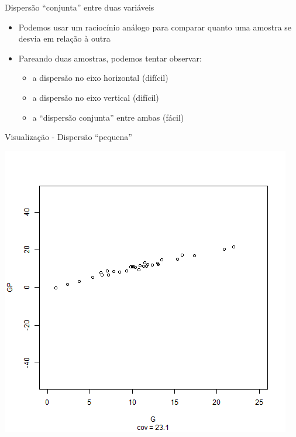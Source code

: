 \documentclass{beamer}
\begin{document}
\begin{frame}{Dispersão ``conjunta'' entre duas variáveis}
  \small
  \begin{itemize}
  \item Podemos usar um raciocínio análogo para comparar quanto uma
    amostra se desvia \alert{em relação à outra}

  \item Pareando duas amostras, podemos tentar observar:
    \begin{itemize}
    \item a dispersão no eixo horizontal (difícil)
    \item a dispersão no eixo vertical (difícil)
      \medskip
    \item a ``dispersão conjunta'' entre ambas (fácil)
    \end{itemize}
  \end{itemize}
\end{frame}

\begin{frame}{\small Visualização - Dispersão ``pequena''}
  \begin{center}
    \includegraphics[height=.8\textheight]{Cap17/anim-1}
  \end{center}
\end{frame}
\end{document}
